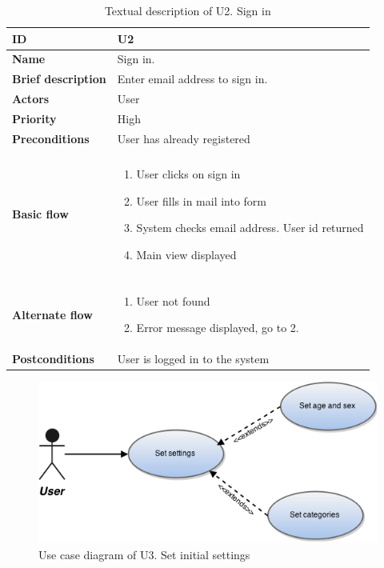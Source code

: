 \begin{table}[htp]
	\centering
	\caption{Textual description of U2. Sign in}
	\begin{tabular}[b]{|l | l|}\hline
		\textbf{ID} 				& U2									\\\hline
		\textbf{Name} 				& Sign in.								\\\hline
		\textbf{Brief description}	& Enter email address to sign in. 		\\\hline
		\textbf{Actors} 			& User									\\\hline
		\textbf{Priority}			& High									\\\hline
		\textbf{Preconditions}		& User has already registered			\\\hline&\\[-2ex]
		\textbf{Basic flow}			& \begin{minipage}{5in}
			\begin{enumerate}[noitemsep]
				\item User clicks on sign in
				\item User fills in mail into form
				\item System checks email address. User id returned
				\item Main view displayed
			\end{enumerate}						
		\end{minipage}						\\\hline&\\[-2ex]
		\textbf{Alternate flow}		& \begin{minipage}{5in}
			\begin{enumerate}[noitemsep]
				\item User not found
				\item Error message displayed, go to 2.
			\end{enumerate}
		\end{minipage}							\\\hline
		\textbf{Postconditions}		& User is logged in to the system\\\hline
	\end{tabular}
	\label{Tab:U2}
\end{table}

\begin{figure}[htp]
	\includegraphics[width=\textwidth]{fig/U3}
	\centering
	\caption{Use case diagram of U3. Set initial settings}
	\label{Fig:U3}
\end{figure}

